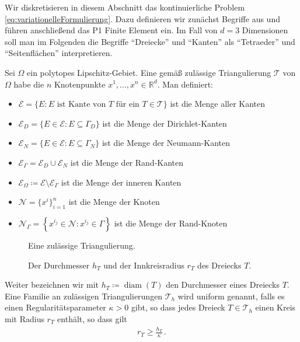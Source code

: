 \documentclass{scrartcl}
\def\R{\mathbb{R}}
\newcommand{\cE}{\mathcal{E}}
\newcommand{\cN}{\mathcal{N}}
\newcommand{\cT}{\mathcal{T}}
\DeclareMathOperator{\diam}{diam}         %
\begin{document}
Wir diskretisieren in diesem Abschnitt das kontinuierliche Problem \eqref{eq:variationelleFormulierung}. Dazu definieren wir zunächst Begriffe aus \cite[Kapitel II.§5]{Bra-2007} und führen anschließend das P1 Finite Element ein.
Im Fall von $d=3$ Dimensionen soll man im Folgenden die Begriffe "`Dreiecke"' und "`Kanten"' als "`Tetraeder"' und "`Seitenflächen"' interpretieren.

Sei $\Omega$ ein polytopes Lipschitz-Gebiet. Eine gemäß \cite[Definition II.5.1]{Bra-2007} zulässige Triangulierung $\cT$ von $\Omega$ habe die $n$ Knotenpunkte $x^{1},\dots,x^{n}\in\R^d$. Man definiert:
\label{se:definitionEN}
\begin{itemize}
	\item
	$\cE=\{E\colon E \text{ ist Kante von } T\text{ für ein }T\in\cT\}$ ist die Menge aller Kanten
	\item
	$\cE_D = \{E\in\cE\colon E\subseteq\Gamma_D\}$ ist die Menge der Dirichlet-Kanten
	\item
	$\cE_N = \{E\in\cE\colon E\subseteq\Gamma_N\}$ ist die Menge der Neumann-Kanten
	\item
	$\cE_\Gamma = \cE_D\cup\cE_N$ ist die Menge der Rand-Kanten
	\item
	$\cE_\Omega\coloneqq \cE\setminus\cE_\Gamma$ ist die Menge der inneren Kanten
	\item
	$\cN =\{x^i\}_{i=1}^n$ ist die Menge der Knoten
	\item
	$\cN_\Gamma = \left\{x^{i_j}\in\cN\colon x^{i_j}\in \Gamma\right\}$ ist die Menge der Rand-Knoten
\end{itemize}

\begin{figure}[h]
\centering
\begin{minipage}[b]{0.48\textwidth}
\centering

\caption{Eine zulässige Triangulierung.}
\end{minipage}
\hfill
\begin{minipage}[b]{0.48\textwidth}
\centering

\vspace*{0.3cm}
\caption{Der Durchmesser $h_T$ und der Inn\-kreisradius $r_T$ des Dreiecks $T$.}
\end{minipage}
\end{figure}

Weiter bezeichnen wir mit $h_T\coloneqq\diam(T)$ den Durchmesser eines Dreiecks $T$.
Eine Familie an zulässigen Triangulierungen $\cT_h$ wird uniform genannt, falls es einen Regularitäts\-parameter $\kappa>0$ gibt, so dass jedes Dreieck $T\in\cT_h$ einen Kreis mit Radius $r_T$ enthält, so dass gilt
\begin{align*}
	r_T\geq \frac{h_T}{\kappa}\,.
\end{align*}
\end{document}

